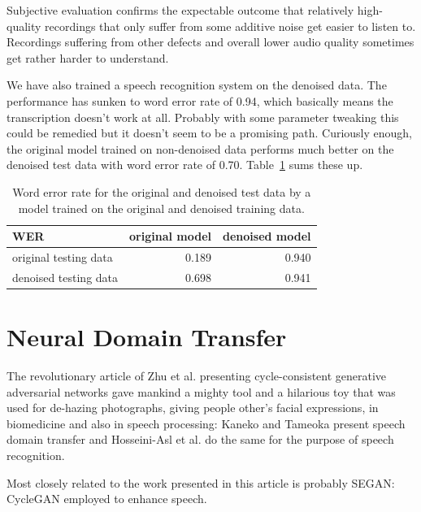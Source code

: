 \documentclass[runningheads]{llncs}
\begin{document}
Subjective evaluation confirms the expectable outcome that relatively
high-quality recordings that only suffer from some additive noise get
easier to listen to. Recordings suffering from other defects and overall lower
audio quality sometimes get rather harder to understand.

We have also trained a speech recognition system on the denoised data. The
performance has sunken to word error rate of 0.94, which basically means the
transcription doesn't work at all. Probably with some parameter tweaking this
could be remedied but it doesn't seem to be a promising path. Curiously enough, the
original model trained on non-denoised data performs much better on the denoised
test data with word error rate of 0.70. Table~\ref{tab:results-denoise} sums
these up.

\begin{table}[htpb]
\begin{center}
\begin{tabular}{|l||r|r|}
\hline
WER    & original model & denoised model \\
\hline
original testing data & 0.189 & 0.940 \\
denoised testing data & 0.698 & 0.941 \\
\hline
\end{tabular}
\caption{Word error rate for the original and denoised test data by a model trained
on the original and denoised training data.}\label{tab:results-denoise}
\end{center}
\end{table}

\section{Neural Domain Transfer}

The revolutionary article of Zhu et al.\cite{cyclegan} presenting
cycle-consistent generative adversarial networks gave mankind a mighty tool and
a hilarious toy that was used for de-hazing
photographs\cite{Engin_2018_CVPR_Workshops}, giving people other's facial
expressions\cite{jin2017faceoff}, in biomedicine\cite{yang2018biogan} and also
in speech processing: Kaneko and Tameoka\cite{kaneko2017parallel} present
speech domain transfer and Hosseini-Asl et al.\cite{hosseini2018malevoicegan} do
the same for the purpose of speech recognition.


Most closely related to the work presented in this article is probably
SEGAN\cite{pascual2017segan}: CycleGAN employed to enhance speech.
\end{document}
